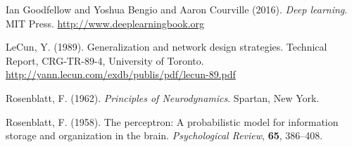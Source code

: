 \documentclass[12pt]{article}
\theoremstyle{plain}
\begin{document}
\newpage

\begin{thebibliography}{Nature}
%

\hypertarget{Deeplea_Goodfellow}{}
Ian Goodfellow and Yoshua Bengio and Aaron Courville (2016). \textit{Deep learning}. MIT Press. \url{http://www.deeplearningbook.org}

\hypertarget{Deeplea_LeCun_1}{}
LeCun, Y. (1989). Generalization and network design strategies. Technical Report, CRG-TR-89-4, University of Toronto. \url{http://yann.lecun.com/exdb/publis/pdf/lecun-89.pdf}

\hypertarget{Deeplea_Rosenblatt_2}{}
Rosenblatt, F. (1962). \textit{Principles of Neurodynamics}. Spartan, New York.

\hypertarget{Deeplea_Rosenblatt_1}{}
Rosenblatt, F. (1958). The perceptron: A probabilistic model for information storage and organization in the brain. \textit{Psychological Review}, \textbf{65}, 386–408.
\end{thebibliography}
\end{document}
